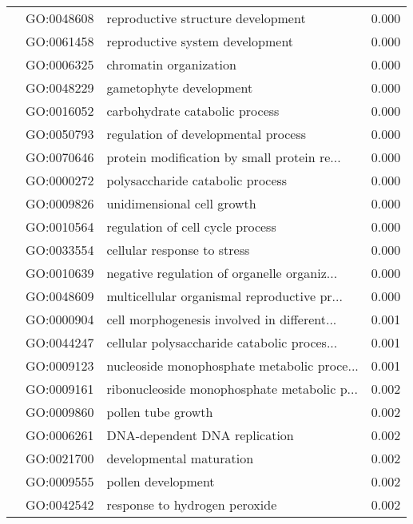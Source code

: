 \begin{longtable}{lllr}
   & GO:0048608 &           reproductive structure development &         0.000 \\
   & GO:0061458 &              reproductive system development &         0.000 \\
   & GO:0006325 &                       chromatin organization &         0.000 \\
   & GO:0048229 &                      gametophyte development &         0.000 \\
   & GO:0016052 &               carbohydrate catabolic process &         0.000 \\
   & GO:0050793 &          regulation of developmental process &         0.000 \\
   & GO:0070646 &  protein modification by small protein re... &         0.000 \\
   & GO:0000272 &             polysaccharide catabolic process &         0.000 \\
   & GO:0009826 &                   unidimensional cell growth &         0.000 \\
   & GO:0010564 &             regulation of cell cycle process &         0.000 \\
   & GO:0033554 &                  cellular response to stress &         0.000 \\
   & GO:0010639 &  negative regulation of organelle organiz... &         0.000 \\
   & GO:0048609 &  multicellular organismal reproductive pr... &         0.000 \\
   & GO:0000904 &  cell morphogenesis involved in different... &         0.001 \\
   & GO:0044247 &  cellular polysaccharide catabolic proces... &         0.001 \\
   & GO:0009123 &  nucleoside monophosphate metabolic proce... &         0.001 \\
   & GO:0009161 &  ribonucleoside monophosphate metabolic p... &         0.002 \\
   & GO:0009860 &                           pollen tube growth &         0.002 \\
   & GO:0006261 &                DNA-dependent DNA replication &         0.002 \\
   & GO:0021700 &                     developmental maturation &         0.002 \\
   & GO:0009555 &                           pollen development &         0.002 \\
   & GO:0042542 &                response to hydrogen peroxide &         0.002 \\

\end{longtable}
